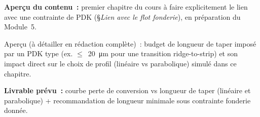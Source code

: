 \noindent\textbf{Aperçu du contenu~:} premier chapitre du cours à faire explicitement le lien avec une contrainte de PDK (\S \emph{Lien avec le flot fonderie}), en préparation du Module~5.

\begin{flotfonderie}
Aperçu (à détailler en rédaction complète)~: budget de longueur de taper imposé par un PDK type (ex. $\leq$~\SI{20}{\micro\metre} pour une transition ridge-to-strip) et son impact direct sur le choix de profil (linéaire vs parabolique) simulé dans ce chapitre.
\end{flotfonderie}

\noindent\textbf{Livrable prévu~:} courbe perte de conversion vs longueur de taper (linéaire et parabolique) + recommandation de longueur minimale sous contrainte fonderie donnée.
